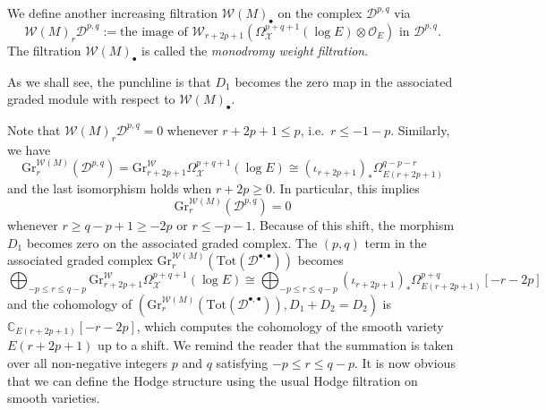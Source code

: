 \begin{definition}
    We define another increasing filtration \(\mathcal{W}(M)_{\bullet}\)
    on the complex \(\mathcal{D}^{p,q}\) via
    \begin{equation*}
        \mathcal{W}(M)_{r}\mathcal{D}^{p,q}:=
        \mbox{the image of \(\mathcal{W}_{r+2p+1}
    (\Omega^{p+q+1}_{\mathcal{X}}(\log E)\otimes\mathscr{O}_{E})\) in \(\mathcal{D}^{p,q}\)}.
    \end{equation*}
The filtration \(\mathcal{W}(M)_{\bullet}\) is called 
the \emph{monodromy weight filtration}.
\end{definition}

\begin{remark}
    As we shall see, the punchline is that \(D_{1}\) becomes the zero map
    in the associated graded module with respect to \(\mathcal{W}(M)_{\bullet}\).
    
\end{remark}
    
    Note that \(\mathcal{W}(M)_{r}\mathcal{D}^{p,q}=0\) whenever \(r+2p+1\le p\),
    i.e.~\(r\le -1-p\).
    Similarly, we have
    \begin{equation*}
        \mathrm{Gr}_{r}^{\mathcal{W}(M)}(\mathcal{D}^{p,q})=
        \mathrm{Gr}_{r+2p+1}^{\mathcal{W}}\Omega^{p+q+1}_{\mathcal{X}}(\log E)
        \cong (\iota_{r+2p+1})_{\ast}\Omega_{E(r+2p+1)}^{q-p-r}
    \end{equation*}
    and the last isomorphism holds when \(r+2p\ge 0\).
    In particular, this implies 
    \begin{equation*}
        \mathrm{Gr}_{r}^{\mathcal{W}(M)}(\mathcal{D}^{p,q}) = 0
    \end{equation*}
    whenever \(r\ge q-p+1\ge -2p\) or \(r\le -p-1\).
    Because of this shift, the morphism \(D_{1}\)
    becomes zero on the associated graded complex.
    The \((p,q)\) term in the associated graded complex 
    \(\mathrm{Gr}_{r}^{\mathcal{W}(M)}(\mathrm{Tot}(\mathcal{D}^{\bullet,\bullet}))\) becomes
    \begin{equation*}
        \bigoplus_{-p\le r\le q-p} \mathrm{Gr}_{r+2p+1}^{\mathcal{W}}\Omega^{p+q+1}_{\mathcal{X}}(\log E)
        \cong \bigoplus_{-p\le r\le q-p} (\iota_{r+2p+1})_{\ast}\Omega^{p+q}_{E(r+2p+1)}[-r-2p]
    \end{equation*}
    and the 
    cohomology of \((\mathrm{Gr}_{r}^{\mathcal{W}(M)}(\mathrm{Tot}(\mathcal{D}^{\bullet,\bullet})),
    D_{1}+D_{2}=D_{2})\)
    is \(\mathbb{C}_{E(r+2p+1)}[-r-2p]\),
    which computes the cohomology
    of the smooth variety \(E(r+2p+1)\) up to a shift.
    We remind the reader that the summation is taken over all
    non-negative integers \(p\) and \(q\) satisfying \(-p\le r\le q-p\).
    It is now obvious that we can define the Hodge structure using
    the usual Hodge filtration on smooth varieties.




